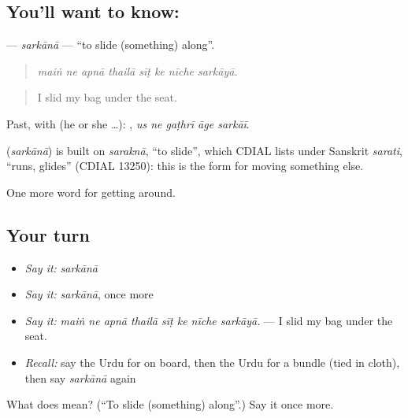 \subsection*{You'll want to know: }
\textbf{} — \emph{sarkānā} — \textquotedblleft{}to slide (something) along\textquotedblright{}.

\begin{quote}
       
\end{quote}

\begin{quote}
\emph{maiṅ ne apnā thailā sīṭ ke nīche sarkāyā.}
\end{quote}

\begin{quote}
I slid my bag under the seat.
\end{quote}

Past, with  (he or she …):     , \emph{us ne gaṭhrī āge sarkāī}.

\begin{cousinweb}
\textbf{} (\emph{sarkānā}) is built on \emph{saraknā}, \textquotedblleft{}to slide\textquotedblright{}, which CDIAL lists under Sanskrit \emph{sarati}, \textquotedblleft{}runs, glides\textquotedblright{} (CDIAL 13250): this is the form for moving something else.
\end{cousinweb}

\begin{grammarlens}[title={What you've built}]
One more word for getting around.
\end{grammarlens}

\subsection*{Your turn}
\begin{itemize}
\raggedright
  \item \emph{Say it:} \emph{sarkānā}
  \item \emph{Say it:} \emph{sarkānā}, once more
  \item \emph{Say it:} \emph{maiṅ ne apnā thailā sīṭ ke nīche sarkāyā.} — I slid my bag under the seat.
  \item \emph{Recall:} say the Urdu for on board, then the Urdu for a bundle (tied in cloth), then say \emph{sarkānā} again
\end{itemize}

\begin{tcolorbox}[breakable,colback=teal!4,colframe=teal!35!black,title={Before you move on}]
What does  mean? (\textquotedblleft{}To slide (something) along\textquotedblright{}.) Say it once more.
\end{tcolorbox}
